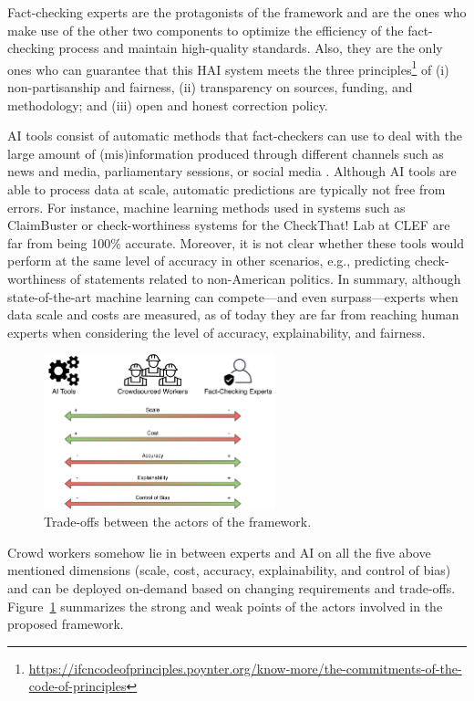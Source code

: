 \documentclass[11pt]{article}
\begin{document}
Fact-checking experts are the protagonists of the framework and are the ones who make use of the other two components to optimize the efficiency of the fact-checking process and maintain high-quality standards. Also, they are the only ones who can guarantee that this HAI system meets the three principles\footnote{\url{https://ifcncodeofprinciples.poynter.org/know-more/the-commitments-of-the-code-of-principles}} of (i) non-partisanship and fairness, (ii) transparency on sources, funding, and methodology; and (iii) open and honest correction policy.
% 

AI tools consist of automatic methods that fact-checkers can use to deal with the large amount of (mis)information produced through different channels such as news and media, parliamentary sessions, or social media \cite{cerone2020wnc}. Although AI tools are able to process data at  scale, automatic predictions are typically not free from errors. For instance, machine learning methods used in systems such as ClaimBuster \cite{claimbuster} or check-worthiness systems for the CheckThat! Lab at CLEF \cite{checkthat} are far from being 100\% accurate.
Moreover, it is not clear whether these tools would perform at the same level of accuracy in other scenarios, e.g., predicting check-worthiness of statements related to non-American politics.
%
In summary, although state-of-the-art machine learning can compete---and even  surpass---experts when data scale and costs are measured, as of today they are far from reaching human experts when considering the level of accuracy, explainability, and fairness.
%
\begin{figure}[tb]
    \centering
    \includegraphics[width=0.6\textwidth,bb=0 0 546 363]{submissions/gianluca/figs/framework-properties.pdf}
    \caption{Trade-offs between the actors of the framework.}
    \label{fig:framework-properties}
\end{figure}

Crowd workers somehow lie in between experts and AI on all the five above mentioned dimensions (scale, cost, accuracy, explainability, and control of bias) and can be deployed on-demand based on changing requirements and trade-offs. Figure~\ref{fig:framework-properties} summarizes the strong and weak points of the actors involved in the proposed framework.
\end{document}

